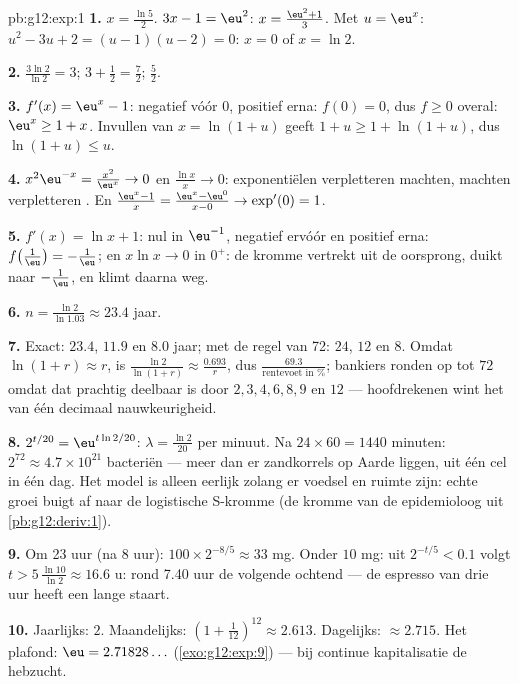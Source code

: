 \begin{solution}{pb:g12:exp:1}
\textbf{1.} $x = \frac{\ln 5}{2}$. \quad $3x - 1 = \eu^2$:
$x = \frac{\eu^2 + 1}{3}$. \quad Met $u = \eu^x$:
$u^2 - 3u + 2 = (u - 1)(u - 2) = 0$: $x = 0$ of $x = \ln 2$.

\textbf{2.} $\frac{3\ln 2}{\ln 2} = 3$; \quad $3 + \frac12 = \frac72$; \quad
$\frac52$.

\textbf{3.} $f'(x) = \eu^x - 1$: negatief vóór $0$, positief erna: 
$f(0) = 0$, dus $f \geq 0$ overal: $\eu^x \geq 1 + x$. Invullen van
$x = \ln(1 + u)$ geeft $1 + u \geq 1 + \ln(1 + u)$, dus
$\ln(1 + u) \leq u$.

\textbf{4.} $x^2\eu^{-x} = \frac{x^2}{\eu^x} \to 0$ en
$\frac{\ln x}{x} \to 0$: exponentiëlen verpletteren machten, machten
verpletteren . En
$\frac{\eu^x - 1}{x} = \frac{\eu^x - \eu^0}{x - 0} \to \exp'(0) = 1$.

\textbf{5.} $f'(x) = \ln x + 1$: nul in $\eu^{-1}$, negatief ervóór en
positief erna:  $f\!\left(\frac1\eu\right) = -\frac1\eu$; en
$x \ln x \to 0$ in $0^+$: de kromme vertrekt uit de oorsprong, duikt naar
$-\frac1\eu$, en klimt daarna weg.

\textbf{6.} $n = \frac{\ln 2}{\ln 1.03} \approx 23.4$ jaar.

\textbf{7.} Exact: $23.4$, $11.9$ en $8.0$ jaar; met de regel van 72: $24$,
$12$ en $8$. Omdat $\ln(1+r) \approx r$, is
$\frac{\ln 2}{\ln(1+r)} \approx \frac{0.693}{r}$, dus
$\frac{69.3}{\text{rentevoet in }\%}$; bankiers ronden op tot $72$ omdat dat
prachtig deelbaar is door $2, 3, 4, 6, 8, 9$ en $12$ --- hoofdrekenen wint
het van één decimaal nauwkeurigheid.

\textbf{8.} $2^{t/20} = \eu^{t \ln 2 / 20}$: $\lambda = \frac{\ln 2}{20}$ per
minuut. Na $24 \times 60 = 1440$ minuten:
$2^{72} \approx 4.7 \times 10^{21}$ bacteriën --- meer dan er zandkorrels op
Aarde liggen, uit één cel in één dag. Het model is alleen eerlijk zolang er
voedsel en ruimte zijn: echte groei buigt af naar de logistische S-kromme
(de kromme van de epidemioloog uit \cref{pb:g12:deriv:1}).

\textbf{9.} Om 23 uur (na $8$ uur): $100 \times 2^{-8/5} \approx 33$ mg.
Onder $10$ mg: uit $2^{-t/5} < 0.1$ volgt
$t > 5\,\frac{\ln 10}{\ln 2} \approx 16.6$ u: rond 7.40 uur de volgende
ochtend --- de espresso van drie uur heeft een lange staart.

\textbf{10.} Jaarlijks: $2$. Maandelijks:
$\left(1 + \frac{1}{12}\right)^{12} \approx 2.613$. Dagelijks:
$\approx 2.715$. Het plafond: $\eu = 2.71828\ldots$
(\cref{exo:g12:exp:9}) --- bij continue kapitalisatie  de
hebzucht.


\end{solution}
